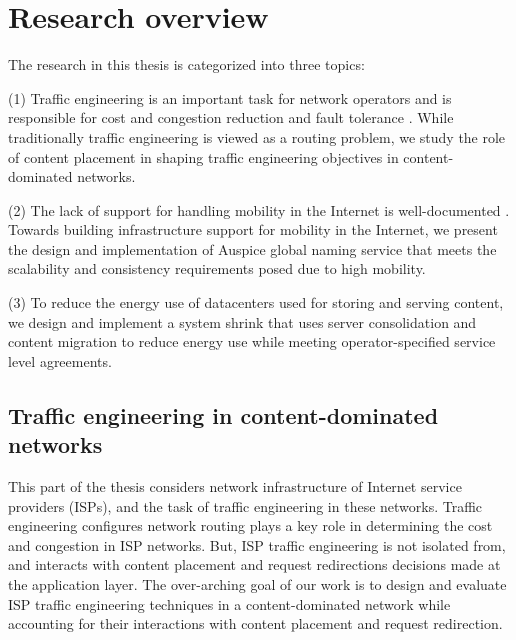 




\section{Research overview}

The research in this thesis is categorized into three topics: 

(1) Traffic engineering is an important task for network operators and is responsible for cost and congestion reduction and fault tolerance \cite{rexford,COPE,TEXCP}. While traditionally traffic engineering is viewed as a routing problem, we study the role of content placement in shaping traffic engineering objectives in content-dominated networks.

(2) The lack of support for handling mobility in the Internet is well-documented \cite{HIP,LISP,HAIR,MobilityFirst}. Towards building infrastructure support for mobility in the Internet, we present the design and implementation of Auspice global naming service that meets the scalability and consistency requirements posed due to high mobility.

(3) To reduce the energy use of datacenters used for storing and serving content, we design and implement a system shrink that uses server consolidation and content migration to reduce energy use while meeting operator-specified service level agreements.


\subsection{Traffic engineering in content-dominated networks}

This part of the thesis considers network infrastructure of Internet service providers (ISPs), and the task of traffic engineering in these networks. Traffic engineering configures network routing plays a key role in determining the cost and congestion in ISP networks. But, ISP traffic engineering is not isolated from, and interacts with content placement and request redirections decisions made at the application layer. The over-arching goal of our work is to design and evaluate ISP traffic engineering techniques in a content-dominated network while accounting for their interactions with content placement and request redirection. 

